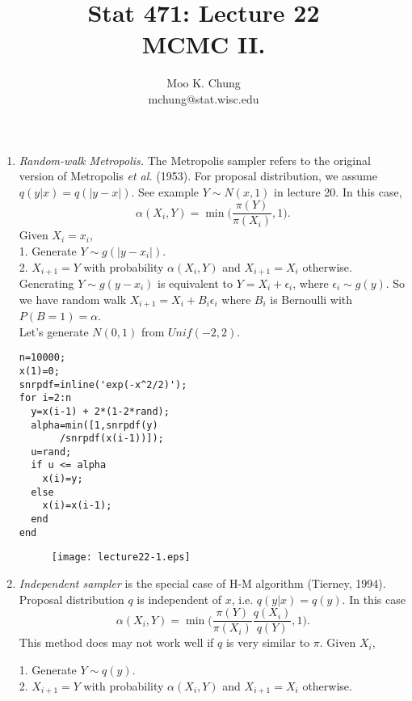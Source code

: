 \documentclass[12pt,twocolumn]{article} %
\begin{document}
\title{Stat 471: Lecture 22\\
MCMC II.}
\author{Moo K. Chung\\
mchung@stat.wisc.edu}
\maketitle \thispagestyle{empty}
\begin{enumerate} 
\item {\em Random-walk Metropolis.} The Metropolis sampler refers to the original version of Metropolis {\em et al.} (1953). For proposal distribution, we assume $q(y|x)=q(|y-x|)$. See example $Y \sim N(x,1)$ in lecture 20. In this case,
$$\alpha(X_i,Y)= \min \Big( \frac{\pi(Y)}{\pi(X_i)}, 1\Big).$$ 
Given $X_i=x_i$,\\
1. Generate $Y \sim g(|y-x_i|)$.\\
2. $X_{i+1} = Y$ with probability $\alpha(X_i,Y)$ and $X_{i+1}=X_i$ otherwise.\\
Generating $Y \sim g(y-x_i)$ is equivalent to $Y = X_i + \epsilon_i$, where $\epsilon_i \sim g(y)$. So we have random walk $X_{i+1} = X_i + B_i\epsilon_i$ where $B_i$ is Bernoulli with $P(B=1)=\alpha$.\\ 

Let's generate $N(0,1)$ from $Unif(-2,2)$.  
\begin{verbatim}
n=10000;
x(1)=0;
snrpdf=inline('exp(-x^2/2)');
for i=2:n
  y=x(i-1) + 2*(1-2*rand);
  alpha=min([1,snrpdf(y)
       /snrpdf(x(i-1))]);
  u=rand;
  if u <= alpha
    x(i)=y;
  else
    x(i)=x(i-1);
  end 
end  
\end{verbatim}
\begin{figure}
\centering
\renewcommand{\baselinestretch}{1}
\texttt{[image: lecture22-1.eps]}
\end{figure}

\item {\em Independent sampler} is the special case of H-M algorithm (Tierney, 1994). Proposal distribution $q$ is independent of $x$, i.e. $q(y|x)=q(y)$. In this case
$$\alpha(X_i,Y)= \min \Big( \frac{\pi(Y)}{\pi(X_i)}\frac{q(X_i)}{q(Y)}, 1\Big).$$
This method does may not work well if $q$ is very similar to $\pi$. Given $X_i$,

1. Generate $Y \sim q(y)$. \\
2. $X_{i+1} = Y$ with probability $\alpha(X_i,Y)$ and $X_{i+1}=X_i$ otherwise.\\ 



\end{enumerate}
\end{document}
